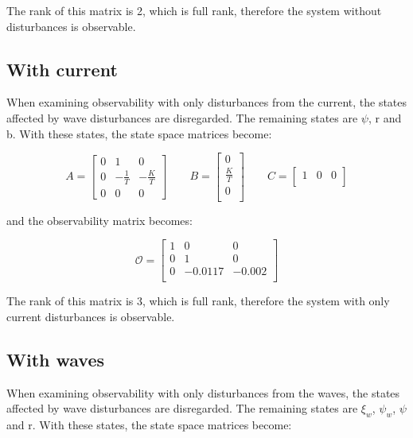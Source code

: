 The rank of this matrix is 2, which is full rank, therefore the system without disturbances is observable.

\subsection{With current}
When examining observability with only disturbances from the current, the states affected by wave disturbances are disregarded. The remaining states are $\psi$, r and b. With these states, the state space matrices become:

\begin{equation}
    A = 
	\begin{bmatrix}
    0 & 1            & 0\\
	0 & -\frac{1}{T} & -\frac{K}{T}\\
	0 & 0            & 0
	\end{bmatrix}
  \qquad
  B =
  \begin{bmatrix}
	0 \\
    \frac{K}{T} \\
    0 \\
  \end{bmatrix}
  \qquad
  C =
  \begin{bmatrix}
    1 & 0 & 0\\
  \end{bmatrix}
\end{equation}

and the observability matrix becomes:

\begin{equation}
  \bm{\mathcal{O}} =
  \begin{bmatrix}
    1 & 0       & 0\\
    0 & 1       & 0\\
    0 & -0.0117 & -0.002 \\
  \end{bmatrix}
\end{equation}

The rank of this matrix is 3, which is full rank, therefore the system with only current disturbances is observable.

\subsection{With waves}
When examining observability with only disturbances from the waves, the states affected by wave disturbances are disregarded. The remaining states are $\xi_w$, $\psi_w$, $\psi$ and r. With these states, the state space matrices become:


